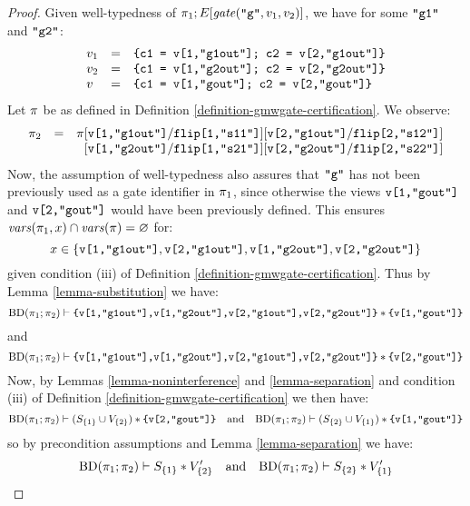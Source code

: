 \begin{proof}
  Given well-typedness of $\pi_1;E[\mathit{gate}(\texttt{"g"},v_1,v_2)]$, we have for some $\texttt{"g1"}$ and $\texttt{"g2"}$:
  $$
  \begin{array}{lcl}
   v_1 &=& \texttt{\{c1 = v[1,"g1out"]; c2 = v[2,"g1out"]\}}\\
   v_2 &=& \texttt{\{c1 = v[1,"g2out"]; c2 = v[2,"g2out"]\}}\\
    v &=& \texttt{\{c1 = v[1,"gout"]; c2 = v[2,"gout"]\}}
  \end{array}
  $$
  Let $\pi$ be as defined in Definition \ref{definition-gmwgate-certification}.
  We observe:
  $$
    \begin{array}{lcl}
      \prog_2 &=&
           \prog[\ttt{v[1,"g1out"]}/\ttt{flip[1,"s11"]}][\ttt{v[2,"g1out"]}/\ttt{flip[2,"s12"]}]\\
      & & \phantom{\prog}[\ttt{v[1,"g2out"]}/\ttt{flip[1,"s21"]}][\ttt{v[2,"g2out"]}/\ttt{flip[2,"s22"]}]
    \end{array}
  $$
  Now, the assumption of well-typedness also assures that $\texttt{"g"}$
  has not been previously used as a gate identifier in $\pi_1$,
  since otherwise the views $\texttt{v[1,"gout"]}$ and $\texttt{v[2,"gout"]}$
  would have been previously defined. This ensures $\mathit{vars}(\pi_1,x)
  \cap \mathit{vars}(\pi) = \varnothing$ for:
  $$x \in \{ \texttt{v[1,"g1out"]}, \texttt{v[2,"g1out"]}, \texttt{v[1,"g2out"]}, \texttt{v[2,"g2out"]}\}$$
  given condition (iii) of Definition \ref{definition-gmwgate-certification}.
  Thus by Lemma \ref{lemma-substitution} we have:
  $$\mathrm{BD}(\pi_1;\pi_2) \vdash \texttt{\{v[1,"g1out"],v[1,"g2out"],v[2,"g1out"],v[2,"g2out"]\}} * \texttt{\{v[1,"gout"]\}}$$
  and
  $$\mathrm{BD}(\pi_1;\pi_2) \vdash \texttt{\{v[1,"g1out"],v[1,"g2out"],v[2,"g1out"],v[2,"g2out"]\}} * \texttt{\{v[2,"gout"]\}}$$
  Now, by Lemmas \ref{lemma-noninterference} and \ref{lemma-separation} and condition (iii) of Definition
  \ref{definition-gmwgate-certification} we then have:
  $$\mathrm{BD}(\pi_1;\pi_2) \vdash (S_{\{1\}} \cup V_{\{2\}}) * \texttt{\{v[2,"gout"]\}} \quad \text{and} \quad
  \mathrm{BD}(\pi_1;\pi_2) \vdash (S_{\{2\}} \cup V_{\{1\}}) * \texttt{\{v[1,"gout"]\}}$$
  so by precondition assumptions and Lemma \ref{lemma-separation} we have:
  $$\mathrm{BD}(\pi_1;\pi_2) \vdash S_{\{1\}} * V'_{\{2\}} \quad \text{and} \quad
  \mathrm{BD}(\pi_1;\pi_2) \vdash S_{\{2\}} * V'_{\{1\}}$$
\end{proof}

